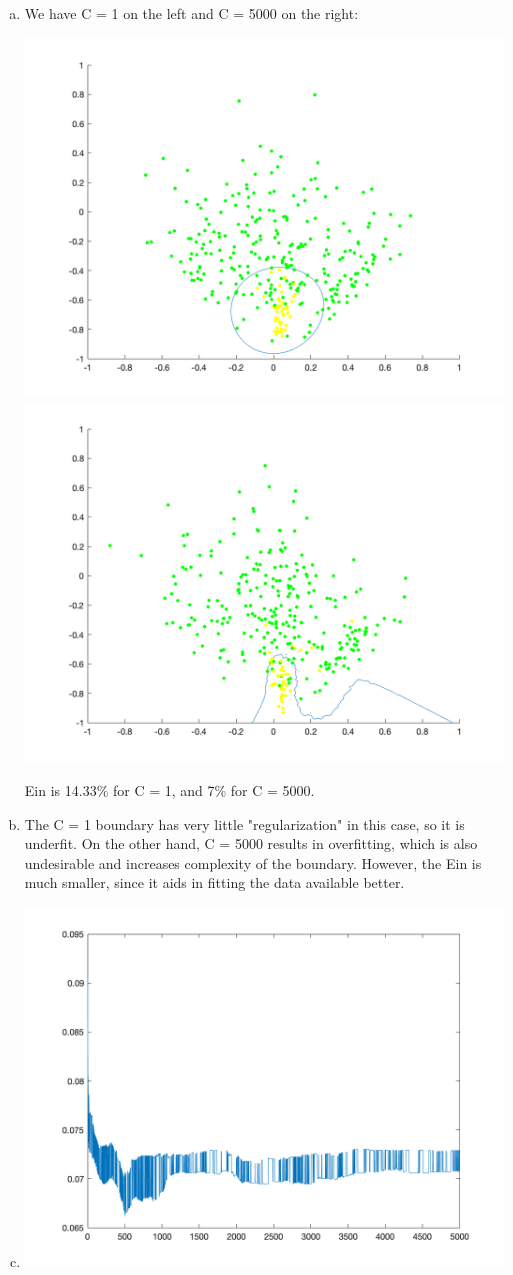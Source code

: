 \documentclass{article}
\begin{document}
\begin{enumerate}[(a)]
  \item \textit{}

    We have C = 1 on the left and C = 5000 on the right:

    \includegraphics[width=.4\textwidth]{svmC1.png}
    \includegraphics[width=.4\textwidth]{svmC5000.png}

    Ein is 14.33\% for C = 1, and 7\% for C = 5000.

  \item \textit{}

    The C = 1 boundary has very little "regularization" in this case, so it is underfit. On the
    other hand, C = 5000 results in overfitting, which is also undesirable and increases
    complexity of the boundary. However, the Ein is much smaller, since it aids in fitting the 
    data available better.

  \item \textit{}

    \includegraphics[width=.8\textwidth]{EcvC5000.png}


\end{enumerate}
\end{document}
